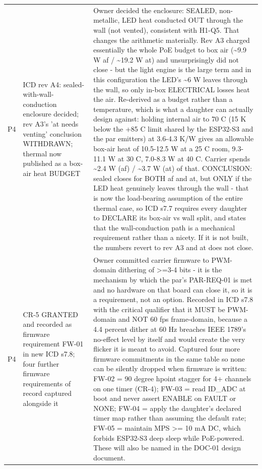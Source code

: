 \documentclass[11pt,a4paper]{article}
\begin{document}
{\begin{longtable}{lp{5.2cm}p{7.2cm}}
P4 & ICD rev A4: sealed-with-wall-conduction enclosure decided; rev A3's 'at needs venting' conclusion WITHDRAWN; thermal now published as a box-air heat BUDGET & Owner decided the enclosure: SEALED, non-metallic, LED heat conducted OUT through the wall (not vented), consistent with H1-Q5. That changes the arithmetic materially. Rev A3 charged essentially the whole PoE budget to box air (\textasciitilde{}9.9 W af / \textasciitilde{}19.2 W at) and unsurprisingly did not close - but the light engine is the large term and in this configuration the LED's \textasciitilde{}6 W leaves through the wall, so only in-box ELECTRICAL losses heat the air. Re-derived as a budget rather than a temperature, which is what a daughter can actually design against: holding internal air to 70 C (15 K below the +85 C limit shared by the ESP32-S3 and the par emitters) at 3.6-4.3 K/W gives an allowable box-air heat of 10.5-12.5 W at a 25 C room, 9.3-11.1 W at 30 C, 7.0-8.3 W at 40 C. Carrier spends \textasciitilde{}2.4 W (af) / \textasciitilde{}3.7 W (at) of that. CONCLUSION: sealed closes for BOTH af and at, but ONLY if the LED heat genuinely leaves through the wall - that is now the load-bearing assumption of the entire thermal case, so ICD s7.7 requires every daughter to DECLARE its box-air vs wall split, and states that the wall-conduction path is a mechanical requirement rather than a nicety. If it is not built, the numbers revert to rev A3 and at does not close. \\
P4 & CR-5 GRANTED and recorded as firmware requirement FW-01 in new ICD s7.8; four further firmware requirements of record captured alongside it & Owner committed carrier firmware to PWM-domain dithering of \textgreater{}=3-4 bits - it is the mechanism by which the par's PAR-REQ-01 is met and no hardware on that board can close it, so it is a requirement, not an option. Recorded in ICD s7.8 with the critical qualifier that it MUST be PWM-domain and NOT 60 fps frame-domain, because a 4.4 percent dither at 60 Hz breaches IEEE 1789's no-effect level by itself and would create the very flicker it is meant to avoid. Captured four more firmware commitments in the same table so none can be silently dropped when firmware is written: FW-02 = 90 degree hpoint stagger for 4+ channels on one timer (CR-4); FW-03 = read ID\_ADC at boot and never assert ENABLE on FAULT or NONE; FW-04 = apply the daughter's declared timer map rather than assuming the default rate; FW-05 = maintain MPS \textgreater{}= 10 mA DC, which forbids ESP32-S3 deep sleep while PoE-powered. These will also be named in the DOC-01 design document. \\

\end{longtable}}
\end{document}
